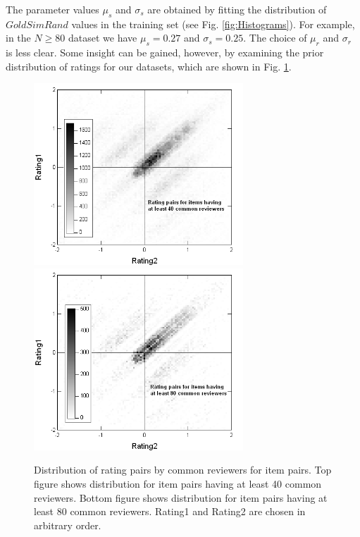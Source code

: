 \documentclass[11pt]{article}
\begin{document}
The parameter values $\mu_s$ and $\sigma_s$ are obtained by fitting the
distribution of $GoldSimRand$ values in the training set (see Fig.
\ref{fig:Histograms}). For example, in the $N \geq 80$ dataset we have $\mu_s =
0.27$ and $\sigma_s = 0.25$. The choice of $\mu_r$ and $\sigma_r$ is less clear.
Some insight can be gained, however, by examining the prior distribution of
ratings for our datasets, which are shown in Fig. \ref{fig:RatingDist}.

\begin{figure}[!htbp]
    \centering
    \includegraphics[width=0.7\textwidth]{RatingDist_40.png}
    \includegraphics[width=0.7\textwidth]{RatingDist_80.png}
	\caption{Distribution of rating pairs by common reviewers for item pairs.
Top figure shows distribution for item pairs having at least 40 common
reviewers. Bottom figure shows distribution for item pairs having at least 80
common reviewers. Rating1 and Rating2 are chosen in arbitrary order.}
    \label{fig:RatingDist}
\end{figure}
\end{document}
